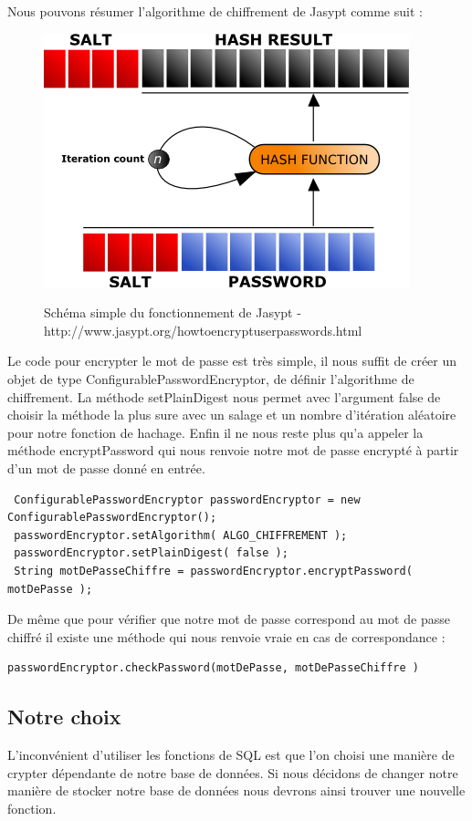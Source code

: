 Nous pouvons résumer l'algorithme de chiffrement de Jasypt comme suit :\\
\begin{figure}[H]
  \center
  \includegraphics[scale=0.7]{../graph/passwordEncryption.png} \\
  \caption{Schéma simple du fonctionnement de Jasypt - http://www.jasypt.org/howtoencryptuserpasswords.html}
\end{figure}
Le code pour encrypter le mot de passe est très simple, il nous suffit de créer un objet de type ConfigurablePasswordEncryptor, de définir l'algorithme de chiffrement. La méthode setPlainDigest nous permet avec l'argument false de choisir la méthode la plus sure avec un salage et un nombre d'itération aléatoire pour notre fonction de hachage. Enfin il ne nous reste plus qu'a appeler la méthode encryptPassword qui nous renvoie notre mot de passe encrypté à partir d'un mot de passe donné en entrée. 
\begin{lstlisting}
 ConfigurablePasswordEncryptor passwordEncryptor = new ConfigurablePasswordEncryptor();
 passwordEncryptor.setAlgorithm( ALGO_CHIFFREMENT );
 passwordEncryptor.setPlainDigest( false );
 String motDePasseChiffre = passwordEncryptor.encryptPassword( motDePasse );
\end{lstlisting} 


De même que pour vérifier que notre mot de passe correspond au mot de passe chiffré il existe une méthode qui nous renvoie vraie en cas de correspondance :

\begin{lstlisting}
passwordEncryptor.checkPassword(motDePasse, motDePasseChiffre )
\end{lstlisting}


\subsection{Notre choix}
L'inconvénient d'utiliser les fonctions de SQL est que l'on choisi une manière de crypter dépendante de notre base de données. Si nous décidons de changer notre manière de stocker notre base de données nous devrons ainsi trouver une nouvelle fonction. \\


